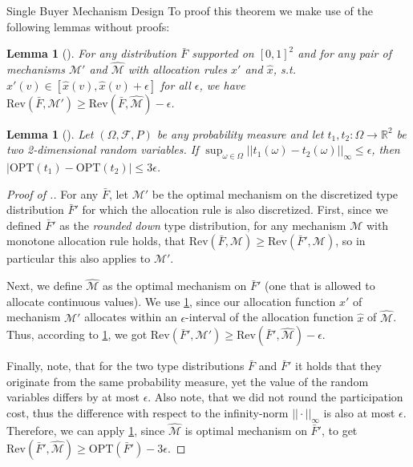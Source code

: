 \documentclass[11pt,a4paper]{article}
\newtheorem{lemma}[theorem]{Lemma}
\newcommand{\1}[1]{\mbox{\rm\bf 1}_{#1}}
\begin{document}
\begin{section}{Single Buyer Mechanism Design}
 To proof this theorem we make use of the following lemmas without proofs:

 \begin{lemma}[\citet{primary}]
     \label{lemma:allocation-function-within-e}
     For any distribution $\bar{F}$ supported on $[0,1]^2$ and for any pair of mechanisms $\mathcal{M}'$ and $\widehat{\mathcal{M}}$
     with allocation rules $x'$ and $\hat{x}$, s.t. $x'(v) \in [\hat{x}(v), \hat{x}(v) + \epsilon]$ for all $\epsilon$, we have $\mathrm{Rev}(\bar{F}, \mathcal{M}') \geq \mathrm{Rev}(\bar{F}, \widehat{\mathcal{M}}) - \epsilon$.
 \end{lemma}
 \begin{lemma}[\citet{primary}]
     \label{lemma:difference-in-optimal-mechanisms}
     Let $(\Omega, \mathcal{F}, P)$ be any probability measure and let $t_1, t_2: \Omega \rightarrow \mathbb{R}^2$ be two 2-dimensional random variables.
     If $\sup_{\omega \in \Omega} || t_1(\omega) - t_2(\omega) ||_\infty \leq \epsilon$, then $|\mathrm{OPT}(t_1) - \mathrm{OPT}(t_2)| \leq 3\epsilon$.
 \end{lemma}

 \begin{proof}[Proof of .]
     For any $\bar{F}$, let $\mathcal{M}'$ be the optimal mechanism on the discretized type distribution $\bar{F}'$ for which the allocation rule is also discretized.
     First, since we defined $\bar{F}'$ as the \textit{rounded down} type distribution, for any mechanism $\mathcal{M}$ with monotone allocation rule holds, that $\mathrm{Rev}(\bar{F}, \mathcal{M}) \geq \mathrm{Rev}(\bar{F}', \mathcal{M})$, so in particular this also applies to $\mathcal{M}'$.

     Next, we define $\widehat{\mathcal{M}}$ as the optimal mechanism on $\bar{F}'$ (one that is allowed to allocate continuous values).
     We use \cref{lemma:allocation-function-within-e}, since our allocation function $x'$ of mechanism $\mathcal{M}'$
     allocates within an $\epsilon$-interval of the allocation function $\hat{x}$ of $\widehat{\mathcal{M}}$.
     Thus, according to \cref{lemma:allocation-function-within-e}, we got $\mathrm{Rev}(\bar{F}', \mathcal{M}') \geq \mathrm{Rev}(\bar{F}', \widehat{\mathcal{M}}) - \epsilon$.

     Finally, note, that for the two type distributions $\bar{F}$ and $\bar{F}'$ it holds that they originate from the same probability measure, yet the value of the random variables differs by at most $\epsilon$.
     Also note, that we did not round the participation cost, thus the difference with respect to the infinity-norm $|| \cdot ||_{\infty}$ is also at most $\epsilon$.
     Therefore, we can apply \cref{lemma:difference-in-optimal-mechanisms}, since $\widehat{\mathcal{M}}$ is optimal mechanism on $\bar{F}'$,
     to get $\mathrm{Rev}(\bar{F}', \widehat{\mathcal{M}}) \geq \mathrm{OPT}(\bar{F}') - 3\epsilon$.


\end{proof}
\end{section}
\end{document}
